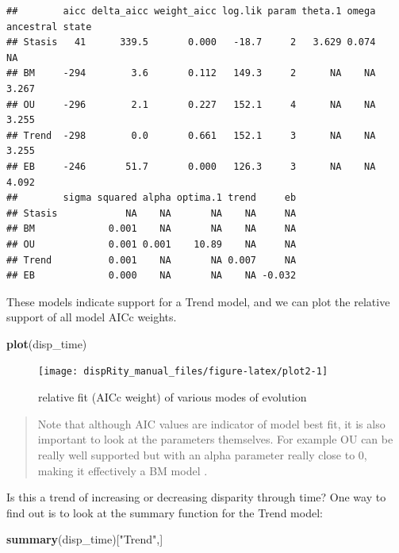 \documentclass[
]{book}
\newenvironment{Shaded}{\begin{snugshade}}{\end{snugshade}}
\newcommand{\KeywordTok}[1]{\textcolor[rgb]{0.13,0.29,0.53}{\textbf{#1}}}
\newcommand{\NormalTok}[1]{#1}
\newcommand{\StringTok}[1]{\textcolor[rgb]{0.31,0.60,0.02}{#1}}
\begin{document}
\begin{verbatim}
##        aicc delta_aicc weight_aicc log.lik param theta.1 omega ancestral state
## Stasis   41      339.5       0.000   -18.7     2   3.629 0.074              NA
## BM     -294        3.6       0.112   149.3     2      NA    NA           3.267
## OU     -296        2.1       0.227   152.1     4      NA    NA           3.255
## Trend  -298        0.0       0.661   152.1     3      NA    NA           3.255
## EB     -246       51.7       0.000   126.3     3      NA    NA           4.092
##        sigma squared alpha optima.1 trend     eb
## Stasis            NA    NA       NA    NA     NA
## BM             0.001    NA       NA    NA     NA
## OU             0.001 0.001    10.89    NA     NA
## Trend          0.001    NA       NA 0.007     NA
## EB             0.000    NA       NA    NA -0.032
\end{verbatim}

These models indicate support for a Trend model, and we can plot the relative support of all model AICc weights.

\begin{Shaded}
\begin{Highlighting}[]
\KeywordTok{plot}\NormalTok{(disp\_time)}
\end{Highlighting}
\end{Shaded}

\begin{figure}

{\centering \texttt{[image: dispRity\_manual\_files/figure-latex/plot2-1]} 

}

\caption{relative fit (AICc weight) of various modes of evolution}\label{fig:plot2}
\end{figure}

\begin{quote}
Note that although AIC values are indicator of model best fit, it is also important to look at the parameters themselves.
For example OU can be really well supported but with an alpha parameter really close to 0, making it effectively a BM model \citep{Cooper2016}.
\end{quote}

Is this a trend of increasing or decreasing disparity through time? One way to find out is to look at the summary function for the Trend model:

\begin{Shaded}
\begin{Highlighting}[]
\KeywordTok{summary}\NormalTok{(disp\_time)[}\StringTok{"Trend"}\NormalTok{,]}
\end{Highlighting}
\end{Shaded}
\end{document}
